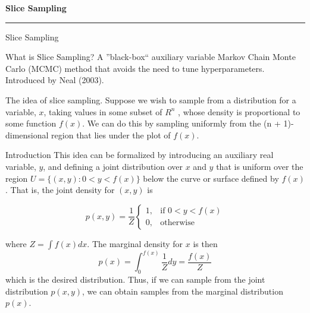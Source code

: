 \documentclass[aspectratio=169]{beamer}
\begin{document}
\begin{frame}
	\vspace{2cm}
	\begin{center}
		{\Huge\textbf{\textcolor{copenhagenred}{Slice Sampling}}}
		\vspace{1cm}

		\rule{4cm}{3pt}
		\vspace{2cm}
	\end{center}
\end{frame}

\begin{frame}{Slice Sampling}
	\begin{block}{What is Slice Sampling?}
		A ''black-box`` auxiliary variable Markov Chain Monte Carlo (MCMC) method that
		avoids the need to tune hyperparameters. Introduced by Neal (2003).
	\end{block}

	The idea of slice sampling. Suppose we wish to sample from a distribution for a
	variable, $x$, taking values in some subset of $R^n$ , whose density is proportional
	to some function $f (x)$. We can do this by sampling uniformly from the
	(n + 1)-dimensional region that lies under the plot of $f (x)$.
\end{frame}

\begin{frame}{Introduction}
	This idea can be
	formalized by introducing an auxiliary real variable, $y$, and deﬁning a joint
	distribution over $x$ and $y$ that is uniform over the region
	$U = \{ (x,y):0 < y < f (x) \}$ below the curve or surface deﬁned
	by $f (x)$. That is, the joint density for $(x,y)$ is

	\begin{equation*}
		p(x,y) = \frac{1}{Z} \begin{cases}
			1, & \text{if } 0 < y < f(x) \\
			0, & \text{otherwise}
		\end{cases}
	\end{equation*}

	where $Z = \int f(x)dx$. The marginal density for $x$ is then
	\begin{equation*}
		p(x) = \int_0^{f(x)} \frac{1}{Z} dy = \frac{f(x)}{Z}
	\end{equation*}
	which is the desired distribution. Thus, if we can sample from the joint
	distribution $p(x,y)$, we can obtain samples from the marginal distribution $p(x)$.
\end{frame}
\end{document}
